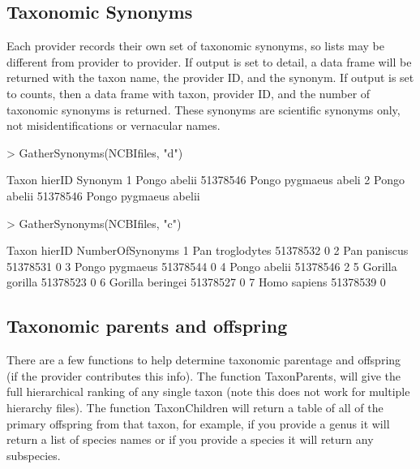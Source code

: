 \documentclass[12pt]{article}
\begin{document}
\subsection{Taxonomic Synonyms}
Each provider records their own set of taxonomic synonyms, so lists may be different from provider to provider. If output is set to detail, a data frame will be returned with the taxon name, the provider ID, and the synonym. If output is set to counts, then a data frame with taxon, provider ID, and the number of taxonomic synonyms is returned. These synonyms are scientific synonyms only, not misidentifications or vernacular names. 

\begin{Schunk}
\begin{Sinput}
> GatherSynonyms(NCBIfiles, "d")
\end{Sinput}
\begin{Soutput}
         Taxon   hierID               Synonym
1 Pongo abelii 51378546  Pongo pygmaeus abeli
2 Pongo abelii 51378546 Pongo pygmaeus abelii
\end{Soutput}
\begin{Sinput}
> GatherSynonyms(NCBIfiles, "c")
\end{Sinput}
\begin{Soutput}
             Taxon   hierID NumberOfSynonyms
1  Pan troglodytes 51378532                0
2     Pan paniscus 51378531                0
3   Pongo pygmaeus 51378544                0
4     Pongo abelii 51378546                2
5  Gorilla gorilla 51378523                0
6 Gorilla beringei 51378527                0
7     Homo sapiens 51378539                0
\end{Soutput}
\end{Schunk}

\subsection{Taxonomic parents and offspring}
There are a few functions to help determine taxonomic parentage and offspring (if the provider contributes this info).  The function TaxonParents, will give the full hierarchical ranking of any single taxon (note this does not work for multiple hierarchy files).  The function TaxonChildren will return a table of all of the primary offspring from that taxon, for example, if you provide a genus it will return a list of species names or if you provide a species it will return any subspecies.
\end{document}
